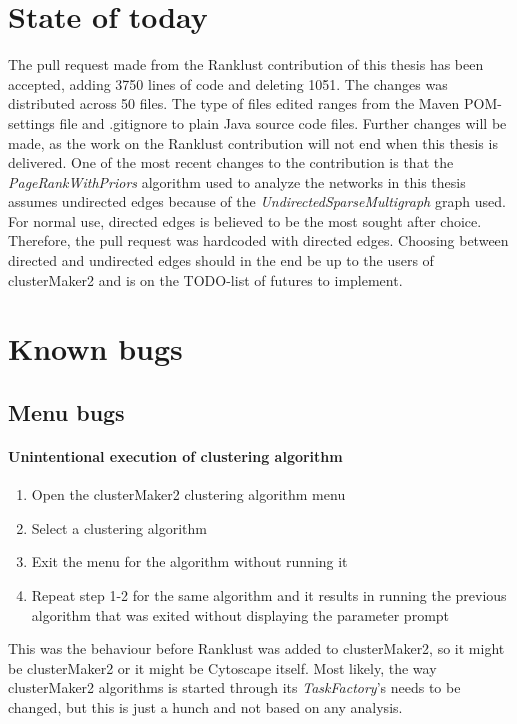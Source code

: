 \section{State of today}
The pull request\cite{git-pull-request} made from the Ranklust
contribution of this thesis has been accepted\cite{ranklust-accepted}, adding
3750 lines of code and deleting 1051. The changes was distributed across 50
files. The type of files edited ranges from the Maven POM-settings file and
.gitignore to plain Java source code files. Further changes will be made, as the
work on the Ranklust contribution will not end when this thesis is delivered.
One of the most recent changes to the contribution is that the
\textit{PageRankWithPriors} algorithm used to analyze the networks in this
thesis assumes undirected edges because of the
\textit{UndirectedSparseMultigraph} graph used. For normal use, directed edges
is believed to be the most sought after choice. Therefore, the pull request was
hardcoded with directed edges. Choosing between directed and undirected edges
should in the end be up to the users of clusterMaker2 and is on the TODO-list of
futures to implement.

\section{Known bugs}
\subsection{Menu bugs}
\paragraph{Unintentional execution of clustering algorithm}
\begin{enumerate}
    \item Open the clusterMaker2 clustering algorithm menu
    \item Select a clustering algorithm
    \item Exit the menu for the algorithm without running it
    \item Repeat step 1-2 for the same algorithm and it results in running the
        previous algorithm that was exited without displaying the parameter
        prompt
\end{enumerate}
This was the behaviour before Ranklust was added to clusterMaker2,
so it might be clusterMaker2 or it might be Cytoscape itself. Most likely, the
way clusterMaker2 algorithms is started through its \textit{TaskFactory}'s needs
to be changed, but this is just a hunch and not based on any analysis.

